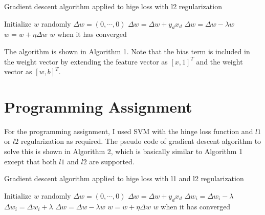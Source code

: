 \begin{enumerate}
\begin{enumerate}
\begin{algorithm}
\caption{Gradient descent algorithm applied to hige loss with l2 regularization}\label{euclid}
\begin{algorithmic}[1]
\State Initialize $w$ randomly
\State $\Delta w=(0, \cdots, 0)$
\State $\Delta w= \Delta w+y_d x_d$
\EndIf
\EndFor
\State $\Delta w=\Delta w - \lambda w$
\State $w=w+\eta \Delta w$
\State \Return $w$ when it has converged
\EndFor
\EndProcedure
\end{algorithmic}
\end{algorithm}

The algorithm is shown in Algorithm 1. Note that the bias term is included in the weight vector by extending the feature vector as $[x, 1]^T$ and the weight vector as $[w, b]^T$.



\end{enumerate}

\end{enumerate}

\section{Programming Assignment}

For the programming assignment, I used SVM with the hinge loss function and $l1$ or $l2$ regularization as required. The pseudo code of gradient descent algorithm to solve this is shown in Algorithm 2, which is basically similar to Algorithm 1 except that both $l1$ and $l2$ are supported.

\begin{algorithm}
\caption{Gradient descent algorithm applied to hige loss with l1 and l2 regularization}\label{euclid}
\begin{algorithmic}[1]
\State Initialize $w$ randomly
\State $\Delta w=(0, \cdots, 0)$
\State $\Delta w= \Delta w+y_d x_d$
\EndIf
\EndFor
{}
\State $\Delta w_i=\Delta w_i-\lambda$
\Else
\State $\Delta w_i=\Delta w_i+\lambda$
\EndIf
\EndFor
{}
\State $\Delta w=\Delta w - \lambda w$
\EndIf
\State $w=w+\eta \Delta w$
\State \Return $w$ when it has converged
\EndFor
\EndProcedure
\end{algorithmic}
\end{algorithm}


